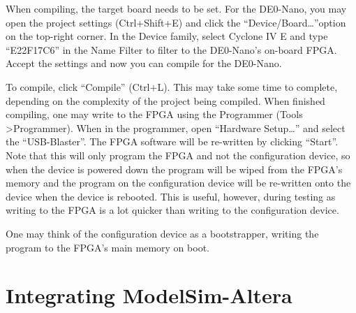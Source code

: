 When compiling, the target board needs to be set. For the DE0-Nano, you may open the project settings (Ctrl+Shift+E) and click the \textquotedblleft Device/Board\dots\textquotedblright  option on the top-right corner. In the Device family, select Cyclone IV E and type ``E22F17C6'' in the Name Filter to filter to the DE0-Nano’s on-board FPGA. Accept the settings and now you can compile for the DE0-Nano.

To compile, click ``Compile'' (Ctrl+L). This may take some time to complete, depending on the complexity of the project being compiled.
When finished compiling, one may write to the FPGA using the Programmer (Tools \textgreater  Programmer). When in the programmer, open ``Hardware Setup\dots'' and select the \textquotedblleft USB-Blaster\textquotedblright. The FPGA software will be re-written by clicking \textquotedblleft Start\textquotedblright. Note that this will only program the FPGA and not the configuration device, so when the device is powered down the program will be wiped from the FPGA’s memory and the program on the configuration device will be re-written onto the device when the device is rebooted. This is useful, however, during testing as writing to the FPGA is a lot quicker than writing to the configuration device.

One may think of the configuration device as a bootstrapper, writing the program to the FPGA's main memory on boot.

\section{Integrating ModelSim-Altera}



